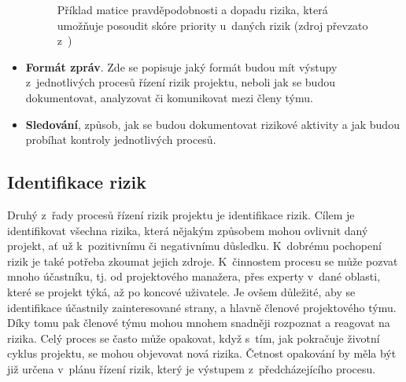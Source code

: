 \begin{itemize}
    \begin{figure}[ht]
    \begin{center}
    \caption{Příklad matice pravděpodobnosti a dopadu rizika, která umožňuje posoudit skóre priority u~daných rizik (zdroj převzato z~\cite{PMBOK})}
    \label{maticePravdepodRizik}
    \end{center}
    \end{figure}
    
    \item \textbf{Formát zpráv}. Zde se popisuje jaký formát budou mít výstupy z~jednotlivých procesů řízení rizik projektu, neboli jak se budou dokumentovat, analyzovat či komunikovat mezi členy týmu.
    \item \textbf{Sledování}, způsob, jak se budou dokumentovat rizikové aktivity a jak budou probíhat kontroly jednotlivých procesů.
\end{itemize}

\subsection{Identifikace rizik}
\label{identRizik}

Druhý z~řady procesů řízení rizik projektu je identifikace rizik. Cílem je identifikovat všechna rizika, která nějakým způsobem mohou ovlivnit daný projekt, ať už k~pozitivnímu či negativnímu důsledku. K~dobrému pochopení rizik je také potřeba zkoumat jejich zdroje. K~činnostem procesu se může pozvat mnoho účastníku, tj. od projektového manažera, přes experty v~dané oblasti, které se projekt týká, až po koncové uživatele. Je ovšem důležité, aby se identifikace účastnily zainteresované strany, a hlavně členové projektového týmu. Díky tomu pak členové týmu mohou mnohem snadněji rozpoznat a reagovat na rizika. Celý proces se často může opakovat, když s~tím, jak pokračuje životní cyklus projektu, se mohou objevovat nová rizika. Četnost opakování by měla být již určena v~plánu řízení rizik, který je výstupem z~předcházejícího procesu.

